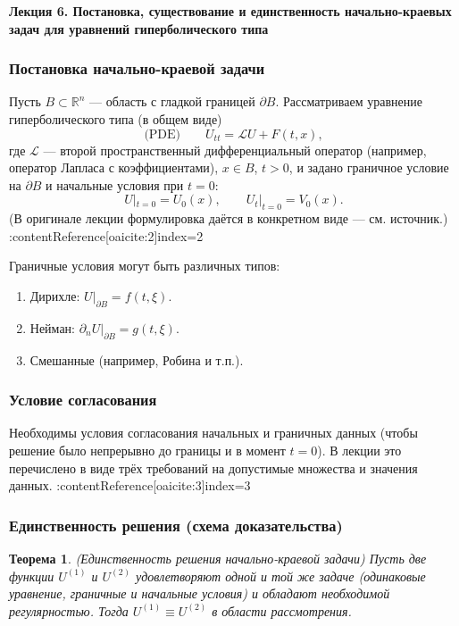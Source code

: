 \documentclass[12pt,a4paper]{article}
\theoremstyle{definition}
\theoremstyle{plain}
\newtheorem{theorem}[definition]{Теорема}
\theoremstyle{remark}
\numberwithin{equation}{subsubsection}
\begin{document}
	
	\begin{center}
		{\Large\bf Лекция 6. Постановка, существование и единственность начально-краевых задач для уравнений гиперболического типа}
	\end{center}
	
	\subsubsection{Постановка начально-краевой задачи}
	Пусть \(B\subset\mathbb{R}^n\) — область с гладкой границей \(\partial B\). Рассматриваем уравнение гиперболического типа (в общем виде)
	\[
	\text{(PDE)}\qquad U_{tt} = \mathcal{L} U + F(t,x),
	\]
	где \(\mathcal{L}\) — второй пространственный дифференциальный оператор (например, оператор Лапласа с коэффициентами), \(x\in B\), \(t>0\), и задано граничное условие на \(\partial B\) и начальные условия при \(t=0\):
	\[
	U|_{t=0}=U_0(x),\qquad U_t|_{t=0}=V_0(x).
	\]
	(В оригинале лекции формулировка даётся в конкретном виде — см. источник.) :contentReference[oaicite:2]{index=2}
	
	Граничные условия могут быть различных типов:
	\begin{enumerate}
		\item Дирихле: \(U|_{\partial B}=f(t,\xi)\).
		\item Нейман: \(\partial_n U|_{\partial B}=g(t,\xi)\).
		\item Смешанные (например, Робина и т.п.).
	\end{enumerate}
	
	\subsubsection{Условие согласования}
	Необходимы условия согласования начальных и граничных данных (чтобы решение было непрерывно до границы и в момент \(t=0\)). В лекции это перечислено в виде трёх требований на допустимые множества и значения данных. :contentReference[oaicite:3]{index=3}
	
	\subsubsection{Единственность решения (схема доказательства)}
	\begin{theorem}
		(Единственность решения начально-краевой задачи)  
		Пусть две функции \(U^{(1)}\) и \(U^{(2)}\) удовлетворяют одной и той же задаче (одинаковые уравнение, граничные и начальные условия) и обладают необходимой регулярностью. Тогда \(U^{(1)}\equiv U^{(2)}\) в области рассмотрения.
	\end{theorem}
	
\end{document}

